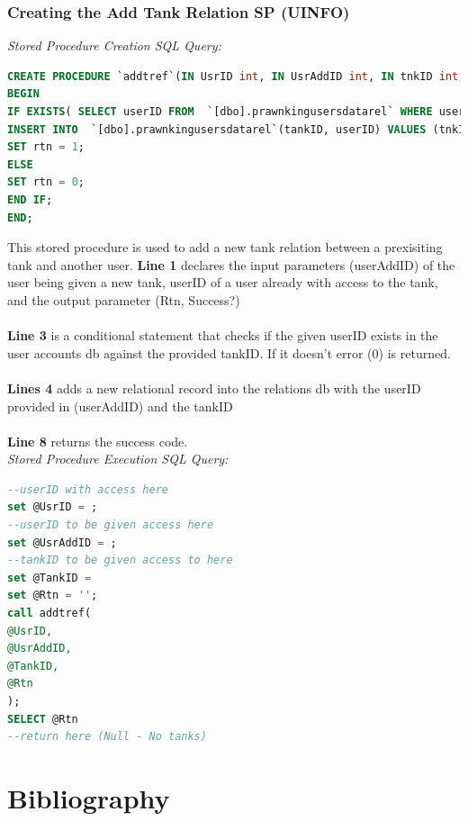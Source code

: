 \documentclass[a4paper,11pt]{proc}
\begin{document}
\subsubsection{Creating the Add Tank Relation SP (UINFO)}
\textit{Stored Procedure Creation SQL Query:}
\begin{lstlisting}[language=SQL,
deletekeywords={IDENTITY,INT},
morekeywords={clustered,OUT, BEGIN, PROCEDURE},    
framesep=10pt,
framextopmargin=10pt]
CREATE PROCEDURE `addtref`(IN UsrID int, IN UsrAddID int, IN tnkID int, OUT rtn varchar(255))
BEGIN
IF EXISTS( SELECT userID FROM  `[dbo].prawnkingusersdatarel` WHERE userID = UsrID and tankID = tnkID ) THEN
INSERT INTO  `[dbo].prawnkingusersdatarel`(tankID, userID) VALUES (tnkID,UsrAddID);
SET rtn = 1;
ELSE
SET rtn = 0;
END IF;
END;
\end{lstlisting}
This stored procedure is used to add a new tank relation between a prexisiting tank and another user. \textbf{Line 1} declares the input parameters (userAddID) of the user being given a new tank, userID of a user already with access to the tank, and the output parameter (Rtn, Success?)\\
\\\textbf{Line 3} is  a conditional statement that checks if the given userID exists in the user accounts db against the provided tankID. If it doesn't error (0) is returned.\\
\\\textbf{Lines 4} adds a new relational record into the relations db with the userID provided in (userAddID) and the tankID\\
\\\textbf{Line 8} returns the success code.
\\\textit{Stored Procedure Execution SQL Query:}
\begin{lstlisting}[language=SQL,
deletekeywords={IDENTITY,INT},
morekeywords={clustered,OUT, BEGIN, PROCEDURE,CALL},    
framesep=10pt,
framextopmargin=10pt]
--userID with access here
set @UsrID = ;
--userID to be given access here
set @UsrAddID = ;
--tankID to be given access to here
set @TankID = 
set @Rtn = '';
call addtref(
@UsrID,
@UsrAddID,
@TankID,
@Rtn
);
SELECT @Rtn
--return here (Null - No tanks)
\end{lstlisting}

\newpage

\section{Bibliography}
\end{document}
